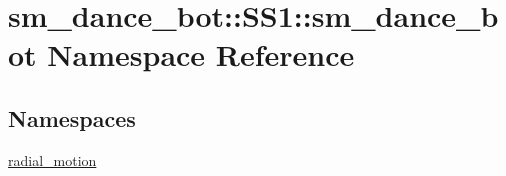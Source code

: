 \hypertarget{namespacesm__dance__bot_1_1SS1_1_1sm__dance__bot}{}\section{sm\+\_\+dance\+\_\+bot\+:\+:S\+S1\+:\+:sm\+\_\+dance\+\_\+bot Namespace Reference}
\label{namespacesm__dance__bot_1_1SS1_1_1sm__dance__bot}
\subsection*{Namespaces}
\begin{DoxyCompactItemize}
\item 
 \hyperlink{namespacesm__dance__bot_1_1SS1_1_1sm__dance__bot_1_1radial__motion}{radial\+\_\+motion}
\end{DoxyCompactItemize}
